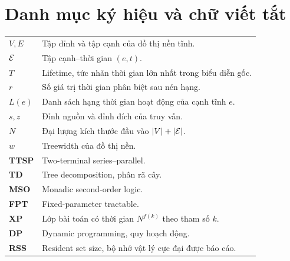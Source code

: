\chapter*{Danh mục ký hiệu và chữ viết tắt}

\begin{longtable}{>{\bfseries}p{3.2cm}p{10.2cm}}
$V,E$ & Tập đỉnh và tập cạnh của đồ thị nền tĩnh.\\
$\mathcal{E}$ & Tập cạnh--thời gian $(e,t)$.\\
$T$ & Lifetime, tức nhãn thời gian lớn nhất trong biểu diễn gốc.\\
$r$ & Số giá trị thời gian phân biệt sau nén hạng.\\
$L(e)$ & Danh sách hạng thời gian hoạt động của cạnh tĩnh $e$.\\
$s,z$ & Đỉnh nguồn và đỉnh đích của truy vấn.\\
$N$ & Đại lượng kích thước đầu vào $|V|+|\mathcal{E}|$.\\
$w$ & Treewidth của đồ thị nền.\\
TTSP & Two-terminal series--parallel.\\
TD & Tree decomposition, phân rã cây.\\
MSO & Monadic second-order logic.\\
FPT & Fixed-parameter tractable.\\
XP & Lớp bài toán có thời gian $N^{f(k)}$ theo tham số $k$.\\
DP & Dynamic programming, quy hoạch động.\\
RSS & Resident set size, bộ nhớ vật lý cực đại được báo cáo.\\
\end{longtable}
